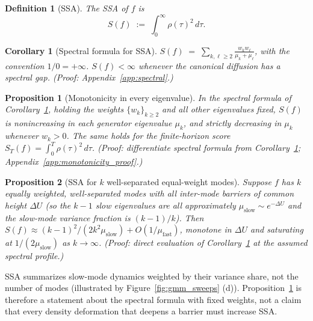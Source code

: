 \documentclass{article}
\newtheorem{proposition}{Proposition}
\newtheorem{corollary}{Corollary}
\newtheorem{definition}{Definition}
\begin{document}
\begin{definition}[SSA]
\label{def:ssa}
The SSA of $f$ is
\begin{equation}
S(f) \;:=\; \int_0^\infty \rho(\tau)^2\,d\tau.
\label{eq:ssa_score}
\end{equation}
\end{definition}

\begin{corollary}[Spectral formula for SSA]
\label{thm:ssa_spectral}
$S(f) \;=\; \displaystyle\sum_{k,\ell \geq 2} \frac{w_k w_\ell}{\mu_k + \mu_\ell}$,
with the convention $1/0 = +\infty$. $S(f)<\infty$ whenever the canonical diffusion has a spectral gap. (Proof: Appendix~\ref{app:spectral}.)
\end{corollary}

\begin{proposition}[Monotonicity in every eigenvalue]
\label{prop:ssa_monotonicity}
In the spectral formula of Corollary~\ref{thm:ssa_spectral}, holding the
weights $\{w_k\}_{k\ge 2}$ and all other eigenvalues fixed, $S(f)$ is
nonincreasing in each generator eigenvalue $\mu_k$, and strictly decreasing in $\mu_k$ whenever $w_k > 0$. The same holds for the finite-horizon score $S_T(f) = \int_0^T \rho(\tau)^2\,d\tau$. (Proof:
differentiate spectral formula from Corollary~\ref{thm:ssa_spectral};
Appendix~\ref{app:monotonicity_proof}.)
\end{proposition}

\begin{proposition}[SSA for $k$ well-separated equal-weight modes]
\label{prop:ssa_k_modes}
Suppose $f$ has $k$ equally weighted, well-separated modes with all inter-mode barriers of common height $\Delta U$ (so the $k-1$ slow eigenvalues are all approximately $\mu_{\mathrm{slow}} \sim e^{-\Delta U}$ and the slow-mode variance fraction is $(k-1)/k$). Then $S(f) \approx (k-1)^2 / (2 k^2 \mu_{\mathrm{slow}}) + O(1/\mu_{\mathrm{fast}})$, monotone in $\Delta U$ and saturating at $1/(2\mu_{\mathrm{slow}})$ as $k \to \infty$. (Proof: direct evaluation of Corollary~\ref{thm:ssa_spectral} at the assumed spectral profile.)
\end{proposition}

\noindent SSA summarizes slow-mode dynamics weighted by their variance
share, not the number of modes (illustrated by
Figure~\ref{fig:gmm_sweeps} (d)). Proposition~\ref{prop:ssa_monotonicity}
is therefore a statement about the spectral formula with fixed weights, not a claim that every density deformation that deepens a barrier
must increase SSA.
\end{document}

